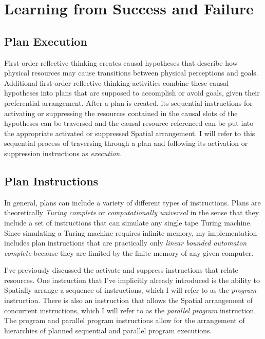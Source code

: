 \chapter{Learning from Success and Failure}
\label{chapter:learning_from_success_and_failure}

\section{Plan Execution}

First-order reflective thinking creates causal hypotheses that
describe how physical resources may cause transitions between physical
perceptions and goals.  Additional first-order reflective thinking
activities combine these causal hypotheses into plans that are
supposed to accomplish or avoid goals, given their preferential
arrangement.  After a plan is created, its sequential instructions for
activating or suppressing the resources contained in the causal slots
of the hypotheses can be traversed and the causal resource referenced
can be put into the appropriate activated or suppressed Spatial
arrangement.  I will refer to this sequential process of traversing
through a plan and following its activation or suppression
instructions as \emph{execution}.

\section{Plan Instructions}

In general, plans can include a variety of different types of
instructions.  Plans are theoretically \emph{Turing complete} or
\emph{computationally universal} in the sense that they include a set
of instructions that can simulate any single tape Turing machine.
Since simulating a Turing machine requires infinite memory, my
implementation includes plan instructions that are practically only
\emph{linear bounded automaton complete} because they are limited by
the finite memory of any given computer.

I've previously discussed the activate and suppress instructions that
relate resources.  One instruction that I've implicitly already
introduced is the ability to Spatially arrange a sequence of
instructions, which I will refer to as the \emph{program} instruction.
There is also an instruction that allows the Spatial arrangement of
concurrent instructions, which I will refer to as the \emph{parallel
  program} instruction.  The program and parallel program instructions
allow for the arrangement of hierarchies of planned sequential and
parallel program executions.

